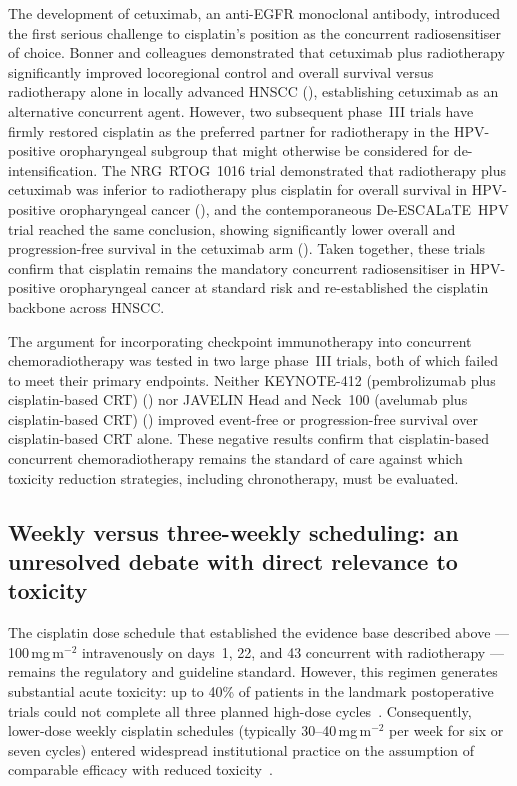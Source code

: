 \documentclass[preprint,review,12pt]{elsarticle}
\begin{document}
The development of cetuximab, an anti-EGFR monoclonal antibody, introduced
the first serious challenge to cisplatin's position as the concurrent
radiosensitiser of choice. Bonner and colleagues demonstrated that
cetuximab plus radiotherapy significantly improved locoregional control and
overall survival versus radiotherapy alone in locally advanced HNSCC
(\cite{Bonner2006}), establishing cetuximab as an alternative concurrent
agent.  However, two subsequent phase~III trials have firmly restored
cisplatin as the preferred partner for radiotherapy in the HPV-positive
oropharyngeal subgroup that might otherwise be considered for
de-intensification.  The NRG~RTOG~1016 trial demonstrated that
radiotherapy plus cetuximab was inferior to radiotherapy plus cisplatin
for overall survival in HPV-positive oropharyngeal cancer
(\cite{Gillison2019}), and the contemporaneous De-ESCALaTE~HPV trial
reached the same conclusion, showing significantly lower overall and
progression-free survival in the cetuximab arm (\cite{Mehanna2019}).
Taken together, these trials confirm that cisplatin remains the mandatory
concurrent radiosensitiser in HPV-positive oropharyngeal cancer at standard
risk and re-established the cisplatin backbone across HNSCC.

The argument for incorporating checkpoint immunotherapy into concurrent
chemoradiotherapy was tested in two large phase~III trials, both of which
failed to meet their primary endpoints. Neither KEYNOTE-412 (pembrolizumab
plus cisplatin-based CRT) (\cite{Machiels2023}) nor JAVELIN Head and
Neck~100 (avelumab plus cisplatin-based CRT) (\cite{LeeNY2021}) improved
event-free or progression-free survival over cisplatin-based CRT alone.
These negative results confirm that cisplatin-based concurrent
chemoradiotherapy remains the standard of care against which toxicity
reduction strategies, including chronotherapy, must be evaluated.

\subsection{Weekly versus three-weekly scheduling: an unresolved debate with
  direct relevance to toxicity}

The cisplatin dose schedule that established the evidence base described
above --- 100\,mg\,m$^{-2}$ intravenously on days~1, 22, and 43 concurrent
with radiotherapy --- remains the regulatory and guideline standard. However,
this regimen generates substantial acute toxicity: up to 40\% of patients
in the landmark postoperative trials could not complete all three planned
high-dose cycles~\cite{Bernier2004, Strojan2016}. Consequently, lower-dose
weekly cisplatin
schedules (typically 30--40\,mg\,m$^{-2}$ per week for six or seven cycles)
entered widespread institutional practice on the assumption of comparable
efficacy with reduced toxicity~\cite{Szturz2017}.
\end{document}
